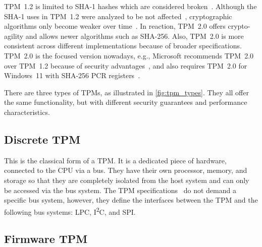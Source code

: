%


TPM~1.2 is limited to SHA-1 hashes which are considered broken~\cite{cryptoeprint:2005/010, Wang2005, Stevens2017}.
Although the SHA-1 uses in TPM~1.2 were analyzed to be not affected~\cite{sha1tpm12}, cryptographic algorithms only become weaker over time~\cite{Arthur2015}.
In reaction, TPM~2.0 offers crypto-agility and allows newer algorithms such as SHA-256.
Also, TPM~2.0 is more consistent across different implementations because of broader specifications.
TPM~2.0 is the focused version nowadays, e.g., Microsoft recommends TPM~2.0 over TPM~1.2 because of security advantages~\cite{micrec}, and also requires TPM~2.0 for Windows~11 with SHA-256 PCR registers~\cite{win11req}.




There are three types of TPMs, as illustrated in \autoref{fig:tpm_types}.
They all offer the same functionality, but with different security guarantees and performance characteristics.


\subsection{Discrete TPM}

This is the classical form of a TPM\@.
It is a dedicated piece of hardware, connected to the CPU via a bus.
They have their own processor, memory, and storage so that they are completely isolated from the host system and can only be accessed via the bus system.
The TPM specifications~\cite{tpm, tcgPcClient} do not demand a specific bus system, however, they define the interfaces between the TPM and the following bus systems: LPC, I\textsuperscript{2}C, and SPI\@.


\subsection{Firmware TPM}

